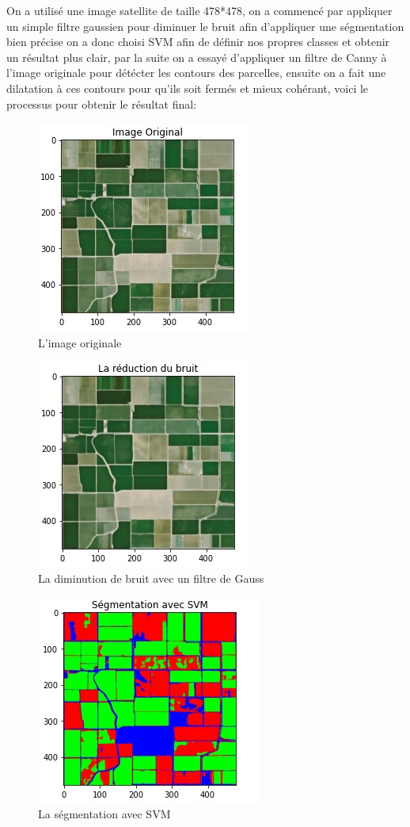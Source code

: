 \documentclass[12pt, openany]{report}
\begin{document}
On a utilisé une image satellite de taille 478*478, on a commencé par appliquer un simple filtre gaussien pour diminuer le bruit afin d'appliquer une ségmentation bien précise on a donc choisi SVM afin de définir nos propres classes et obtenir un résultat plus clair, par la suite on a essayé d'appliquer un filtre de Canny à l'image originale pour détécter les contours des parcelles, ensuite on a fait une dilatation à ces contours pour qu'ils soit fermés et mieux cohérant, voici le processus pour obtenir le résultat final: 

\begin{figure}[H]
\centering
\includegraphics[scale=1]{imgor.jpg}
\caption{L'image originale}
\end{figure}

\begin{figure}[H]
\centering
\includegraphics[scale=1]{blur.jpg}
\caption{La diminution de bruit avec un filtre de Gauss}
\end{figure}

\begin{figure}[H]
\centering
\includegraphics[scale=1]{svm.jpg}
\caption{La ségmentation avec SVM}
\end{figure}
\end{document}
